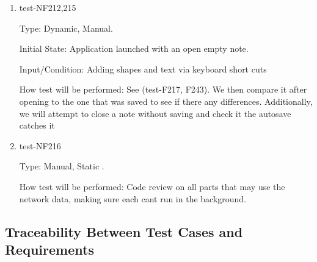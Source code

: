 \documentclass[12pt, titlepage]{article}
\begin{document}
\begin{enumerate}

\item{test-NF212,215}

Type: Dynamic, Manual.

Initial State: Application launched with an open empty note.

Input/Condition: Adding shapes and text via keyboard short cuts

How test will be performed: See (test-F217, F243). We then compare it after opening to the one that was saved to see if there any differences. Additionally, we will attempt to close a note without saving and check it the autosave catches it 

\item{test-NF216}

Type: Manual, Static .

How test will be performed: Code review on all parts that may use the network data, making sure each cant run in the background.

\end{enumerate}


\subsection{Traceability Between Test Cases and Requirements}

\end{document}
